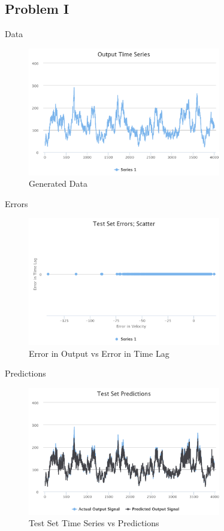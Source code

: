 \documentclass{beamer}
\begin{document}
\subsection{Problem I}
\begin{frame}{Data}
    \begin{figure}[h]
        \includegraphics[width=0.75\textwidth]{timeseries-problem-i.png}
        \caption{Generated Data}
        \label{fig:TimeSeries-i}
      \end{figure}
\end{frame}

\begin{frame}{Errors}
    \begin{figure}[h]
        \includegraphics[width=0.75\textwidth]{errors-i.png}
        \caption{Error in Output vs Error in Time Lag}
        \label{fig:errors-i}
      \end{figure}
\end{frame}

\begin{frame}{Predictions}
    \begin{figure}[h]
        \includegraphics[width=0.75\textwidth]{predictions-i.png}
        \caption{Test Set Time Series vs Predictions}
        \label{fig:predictions-i}
      \end{figure}
\end{frame}
\end{document}
